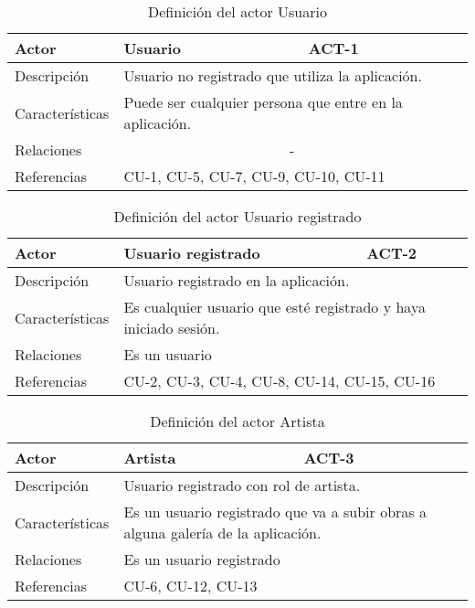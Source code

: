 \begin{table}[H]
    \begin{tabular}{|p{3cm}|p{5cm}|p{2cm}|}
        \hline
        Actor & Usuario & ACT-1 \\
        \hline
        Descripción & \multicolumn{2}{|p{7cm}|}{Usuario no registrado
        que utiliza la aplicación.} \\
        \hline
        Características & \multicolumn{2}{|p{7cm}|}{Puede ser cualquier persona
        que entre en la aplicación.} \\
        \hline
        Relaciones & \multicolumn{2}{|c|}{-} \\
        \hline
        Referencias & \multicolumn{2}{|p{7cm}|}{CU-1, CU-5, CU-7, CU-9, CU-10,
        CU-11} \\
        \hline
    \end{tabular}
    \caption{Definición del actor Usuario}
    \label{tab:actor_usuario}
\end{table}

\begin{table}[H]
    \begin{tabular}{|p{3cm}|p{5cm}|p{2cm}|}
        \hline
        Actor & Usuario registrado & ACT-2 \\
        \hline
        Descripción & \multicolumn{2}{|p{7cm}|}{Usuario registrado en la aplicación.} \\
        \hline
        Características & \multicolumn{2}{|p{7cm}|}{Es cualquier usuario que esté
        registrado y haya iniciado sesión.} \\
        \hline
        Relaciones & \multicolumn{2}{|p{7cm}|}{Es un usuario} \\
        \hline
        Referencias & \multicolumn{2}{|p{7cm}|}{CU-2, CU-3, CU-4, CU-8, CU-14,
        CU-15, CU-16} \\
        \hline
    \end{tabular}
    \caption{Definición del actor Usuario registrado}
    \label{tab:actor_usuario_registrado}
\end{table}

\begin{table}[H]
    \begin{tabular}{|p{3cm}|p{5cm}|p{2cm}|}
        \hline
        Actor & Artista & ACT-3 \\
        \hline
        Descripción & \multicolumn{2}{|p{7cm}|}{Usuario registrado con rol de artista.} \\
        \hline
        Características & \multicolumn{2}{|p{7cm}|}{Es un usuario registrado que
        va a subir obras a alguna galería de la aplicación.} \\
        \hline
        Relaciones & \multicolumn{2}{|p{7cm}|}{Es un usuario registrado} \\
        \hline
        Referencias & \multicolumn{2}{|p{7cm}|}{CU-6, CU-12, CU-13} \\
        \hline
    \end{tabular}
    \caption{Definición del actor Artista}
    \label{tab:actor_artista}
\end{table}

